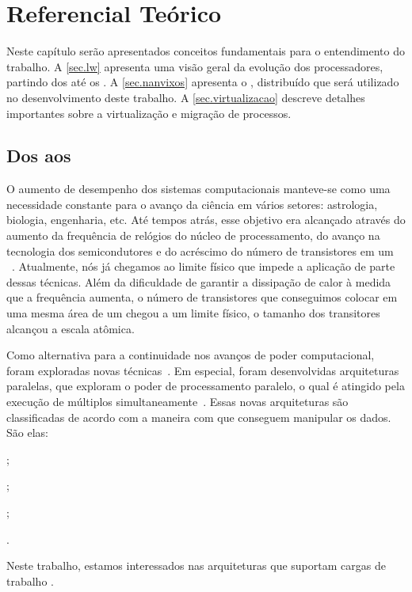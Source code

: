 \glsresetall

\chapter{Referencial Teórico}
\label{chap.background}

Neste capítulo serão apresentados conceitos fundamentais para o entendimento do trabalho. A \autoref{sec.lw} apresenta uma visão geral da evolução dos processadores, partindo dos \singlecores até os \lws. A \autoref{sec.nanvixos} apresenta o \nanvix, \so distribuído que será utilizado no desenvolvimento deste trabalho. A \autoref{sec.virtualizacao} descreve detalhes importantes sobre a virtualização e migração de processos.

\section{Dos \singlecores aos \Lws}
\label{sec.lw}

O aumento de desempenho dos sistemas computacionais manteve-se como uma necessidade constante para o avanço da ciência em vários setores: astrologia, biologia, engenharia, etc. Até tempos atrás, esse objetivo era alcançado através do aumento da frequência de relógios do núcleo de processamento, do avanço na tecnologia dos semicondutores e do acréscimo do número de transistores em um \chip~\cite{amrouch2018negative}. Atualmente, nós já chegamos ao limite físico que impede a aplicação de parte dessas técnicas. Além da dificuldade de garantir a dissipação de calor à medida que a frequência aumenta, o número de transistores que conseguimos colocar em uma mesma área de um \chip chegou a um limite físico, \ie o tamanho dos transitores alcançou a escala atômica.

Como alternativa para a continuidade nos avanços de poder computacional, foram exploradas novas técnicas~\cite{fuller2011computing,gepner2006multi}. Em especial, foram desenvolvidas arquiteturas paralelas, que exploram o poder de processamento paralelo, o qual é atingido pela execução de múltiplos \cores simultaneamente~\cite{gepner2006multi}. Essas novas arquiteturas são classificadas de acordo com a maneira com que conseguem manipular os dados. São elas:
\begin{inlinelist}
    \item \sisd;
    \item \simd;
    \item \misd;
    \item \mimd.
\end{inlinelist}
Neste trabalho, estamos interessados nas arquiteturas que suportam cargas de trabalho \mimd. 

